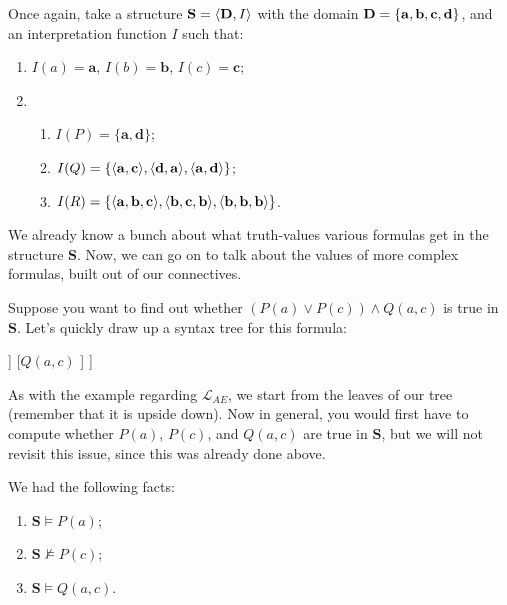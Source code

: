 Once again, take a structure $\mathbf{S}=\langle\mathbf{D}, I\rangle$ with the domain $\mathbf{D}=\{\mathbf{a}, \mathbf{b}, \mathbf{c}, \mathbf{d}\}$, and an interpretation function $I$ such that:

\begin{enumerate}
	\item $I(a)=\mathbf{a}$, $I(b)=\mathbf{b}$, $I(c)=\mathbf{c}$; 
	\item 
	\begin{enumerate}
		\item $I(P)=\{\mathbf{a}, \mathbf{d}\}$;
		\item $I(Q)=\{\langle\mathbf{a}, \mathbf{c}\rangle, \langle\mathbf{d}, \mathbf{a}\rangle, \langle\mathbf{a}, \mathbf{d}\rangle\}$;
		\item $I(R)=\{\langle\mathbf{a}, \mathbf{b}, \mathbf{c}\rangle, \langle\mathbf{b}, \mathbf{c}, \mathbf{b}\rangle, \langle\mathbf{b}, \mathbf{b}, \mathbf{b}\rangle\}$.
	\end{enumerate} 
\end{enumerate}

We already know a bunch about what truth-values various formulas get in the structure $\mathbf{S}$. Now, we can go on to talk about the values of more complex formulas, built out of our connectives. 

Suppose you want to find out whether $(P(a) \vee P(c)) \wedge Q(a, c)$ is true in $\mathbf{S}$. Let's quickly draw up a syntax tree for this formula:

\begin{center}
\begin{forest}
[{$(P(a) \vee P(c)) \wedge Q(a, c)$}
	[{$P(a) \vee P(c)$}
		[{$P(a)$}
		]
		[{$P(c)$}
		]
	]
	[${Q(a, c)}$
	]
]
\end{forest}
\end{center}

As with the example regarding $\mathcal{L}_{AE}$, we start from the leaves of our tree (remember that it is upside down). Now in general, you would first have to compute whether $P(a)$, $P(c)$, and $Q(a, c)$ are true in $\mathbf{S}$, but we will not revisit this issue, since this was already done above. 

We had the following facts:

\begin{enumerate}
	\item $\mathbf{S} \models P(a)$;
	\item $\mathbf{S} \not\models P(c)$;
	\item $\mathbf{S} \models Q(a, c)$.
\end{enumerate}

